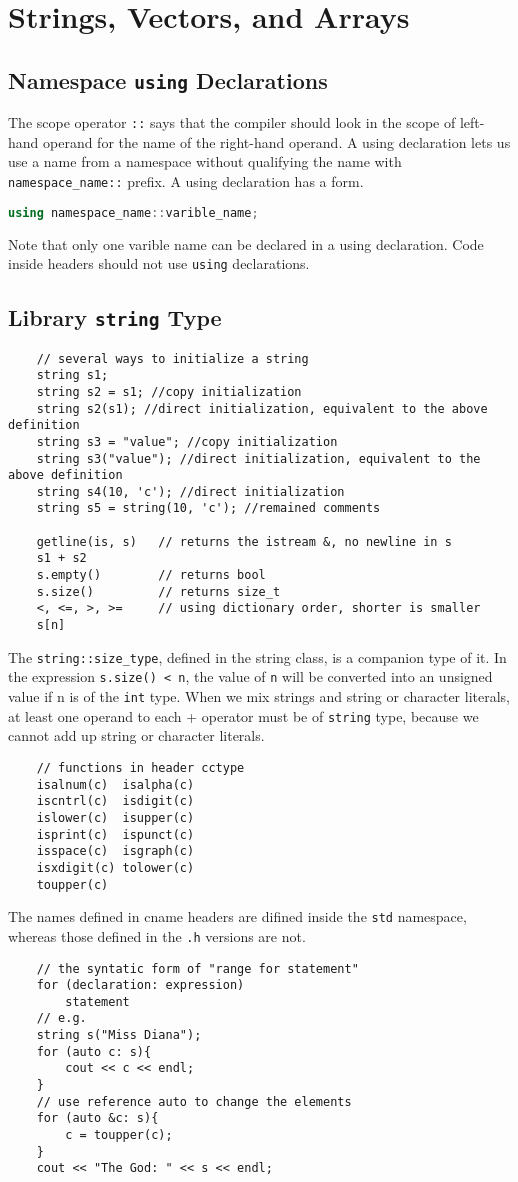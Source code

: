 \documentclass[11pt]{ctexart}
\begin{document}
\section{Strings, Vectors, and Arrays}
\subsection{Namespace \texttt{using} Declarations}
The scope operator \verb|::| says that the compiler should look in the scope of left-hand operand for the name of the right-hand operand. A using declaration lets us use a name from a namespace without qualifying the name with \verb|namespace_name::| prefix. A using declaration has a form.
\begin{lstlisting}[language=C++, frame=none]
    using namespace_name::varible_name;
\end{lstlisting}
Note that only one varible name can be declared in a using declaration. Code inside headers should not use \texttt{using} declarations.
\subsection{Library \texttt{string} Type}
\begin{lstlisting}
    // several ways to initialize a string
    string s1;
    string s2 = s1; //copy initialization
    string s2(s1); //direct initialization, equivalent to the above definition
    string s3 = "value"; //copy initialization
    string s3("value"); //direct initialization, equivalent to the above definition
    string s4(10, 'c'); //direct initialization
    string s5 = string(10, 'c'); //remained comments

    getline(is, s)   // returns the istream &, no newline in s
    s1 + s2
    s.empty()        // returns bool
    s.size()         // returns size_t
    <, <=, >, >=     // using dictionary order, shorter is smaller
    s[n]
\end{lstlisting}
The \verb|string::size_type|, defined in the string class, is a companion type of it. In the expression \verb|s.size() < n|, the value of \verb|n| will be converted into an unsigned value if n is of the \verb|int| type. When we mix strings and string or character literals, at least one operand to each + operator must be of \verb|string| type, because we cannot add up string or character literals.
\begin{lstlisting}
    // functions in header cctype
    isalnum(c)  isalpha(c)
    iscntrl(c)  isdigit(c)
    islower(c)  isupper(c)
    isprint(c)  ispunct(c)
    isspace(c)  isgraph(c)
    isxdigit(c) tolower(c)
    toupper(c)
\end{lstlisting}
The names defined in cname headers are difined inside the \verb|std| namespace, whereas those defined in the \verb|.h| versions are not.
\begin{lstlisting}
    // the syntatic form of "range for statement"
    for (declaration: expression)
        statement
    // e.g.
    string s("Miss Diana");
    for (auto c: s){
        cout << c << endl;
    }
    // use reference auto to change the elements
    for (auto &c: s){
        c = toupper(c);
    }
    cout << "The God: " << s << endl;
\end{lstlisting}
\end{document}
